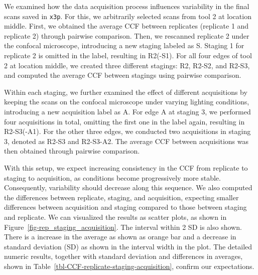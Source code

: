 \documentclass[fleqn,10pt]{wlscirep}
\begin{document}
We examined how the data acquisition process influences variability in
the final scans saved in \texttt{x3p}. For this, we arbitrarily selected
scans from tool 2 at location middle. First, we obtained the average CCF
between replicates (replicate 1 and replicate 2) through pairwise
comparison. Then, we rescanned replicate 2 under the confocal
microscope, introducing a new staging labeled as S. Staging 1 for
replicate 2 is omitted in the label, resulting in R2(-S1). For all four
edges of tool 2 at location middle, we created three different stagings:
R2, R2-S2, and R2-S3, and computed the average CCF between stagings
using pairwise comparison.

Within each staging, we further examined the effect of different
acquisitions by keeping the scans on the confocal microscope under
varying lighting conditions, introducing a new acquisition label as A.
For edge A at staging 3, we performed four acquisitions in total,
omitting the first one in the label again, resulting in R2-S3(-A1). For
the other three edges, we conducted two acquisitions in staging 3,
denoted as R2-S3 and R2-S3-A2. The average CCF between acquisitions was
then obtained through pairwise comparison.

With this setup, we expect increasing consistency in the CCF from
replicate to staging to acquisition, as conditions become progressively
more stable. Consequently, variability should decrease along this
sequence. We also computed the differences between replicate, staging,
and acquisition, expecting smaller differences between acquisition and
staging compared to those between staging and replicate. We can
visualized the results as scatter plots, as shown in
Figure~\ref{fig-rep_staging_acquisition}. The interval within 2 SD is
also shown. There is a increase in the average as shown as orange bar
and a decrease in standard deviation (SD) as shown in the interval width
in the plot. The detailed numeric results, together with standard
deviation and differences in averages, shown in
Table~\ref{tbl-CCF-replicate-staging-acquisition}, confirm our
expectations.
\end{document}

